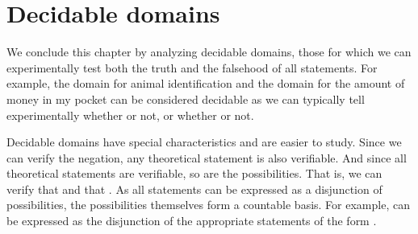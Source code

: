 \documentclass[11pt,letterpaper,fleqn]{memoir} %
\begin{document}
\section{Decidable domains}

We conclude this chapter by analyzing decidable domains, those for which we can experimentally test both the truth and the falsehood of all statements. For example, the domain for animal identification and the domain for the amount of money in my pocket can be considered decidable as we can typically tell experimentally whether  or not, or whether  or not.

Decidable domains have special characteristics and are easier to study. Since we can verify the negation, any theoretical statement is also verifiable. And since all theoretical statements are verifiable, so are the possibilities. That is, we can verify that  and that . As all statements can be expressed as a disjunction of possibilities, the possibilities themselves form a countable basis. For example,  can be expressed as the disjunction of the appropriate statements of the form .
\end{document}
